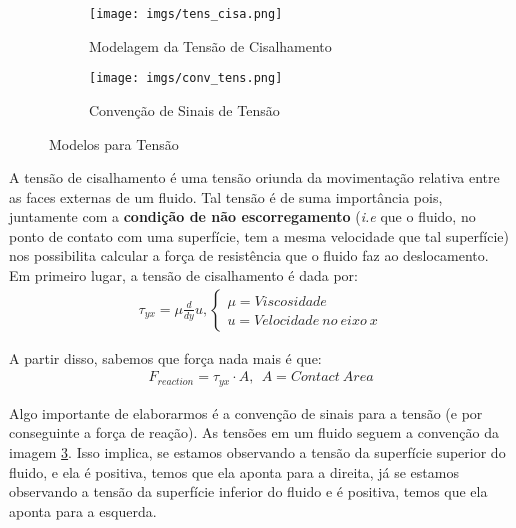 \documentclass{article}
\begin{document}
            \begin{figure}[H]
                \begin{subfigure}{0.5\textwidth}
                    \centering
                    \texttt{[image: imgs/tens\_cisa.png]}
                    \caption{Modelagem da Tensão de Cisalhamento}\label{img:tens_cis}
                \end{subfigure}%
            \begin{subfigure}{.5\textwidth}
                \centering
                    \texttt{[image: imgs/conv\_tens.png]}
                    \caption{Convenção de Sinais de Tensão}\label{img:conv_sinais}
                \end{subfigure}
                \caption[]{Modelos para Tensão}
            \end{figure}

            A tensão de cisalhamento é uma tensão oriunda da movimentação relativa entre as faces externas de um fluido. Tal tensão é de suma importância pois, juntamente com a \textbf{condição de não
            escorregamento} (\emph{i.e} que o fluido, no ponto de contato com uma superfície, tem a mesma velocidade que tal superfície) nos possibilita calcular a força de resistência que o fluido
            faz ao deslocamento. 
            Em primeiro lugar, a tensão de cisalhamento é dada por:
            \begin{align}
                \tau_{yx} = \mu \frac{d}{dy} u, \begin{cases}
                    \mu = Viscosidade \\ 
                    u = Velocidade \ no \ eixo \ x
                \end{cases}
            \end{align}

            A partir disso, sabemos que força nada mais é que:
            \begin{align}
                F_{reaction} = \tau_{yx} \cdot A, \ \ A= Contact \ Area
            \end{align}


            Algo importante de elaborarmos é a convenção de sinais para a tensão (e por conseguinte a força de reação). As tensões em um fluido seguem a convenção da imagem \ref{img:conv_sinais}. Isso
            implica, se estamos observando a tensão da superfície superior do fluido, e ela é positiva, temos que ela aponta para a direita, já se estamos observando a tensão da superfície inferior
            do fluido  e é positiva, temos que ela aponta para a esquerda.
\end{document}
